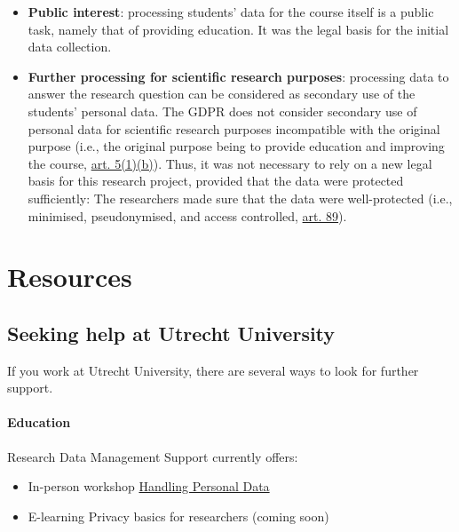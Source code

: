 \documentclass[
]{book}
\providecommand{\tightlist}{%
  \setlength{\itemsep}{0pt}\setlength{\parskip}{0pt}}
\begin{document}
\begin{itemize}
  \begin{itemize}
  \tightlist
  \item
    \textbf{Public interest}: processing students' data for the course itself is a
    public task, namely that of providing education. It was the legal basis for
    the initial data collection.
  \item
    \textbf{Further processing for scientific research purposes}: processing data to
    answer the research question can be considered as secondary use of the
    students' personal data. The GDPR does not consider secondary use of personal
    data for scientific research purposes incompatible with the original purpose
    (i.e., the original purpose being to provide education and improving the
    course, \href{https://gdpr-info.eu/art-5-gdpr/}{art. 5(1)(b)}).
    Thus, it was not necessary to rely on a new legal basis for this research
    project, provided that the data were protected sufficiently: The researchers
    made sure that the data were well-protected (i.e., minimised, pseudonymised,
    and access controlled, \href{https://gdpr-info.eu/art-89-gdpr/}{art. 89}).
  \end{itemize}
\end{itemize}

\hypertarget{part-resources}{%
\part*{Resources}\label{part-resources}}

\hypertarget{seeking-help}{%
\chapter{Seeking help at Utrecht University}\label{seeking-help}}

If you work at Utrecht University, there are several ways to look for further support.

\hypertarget{education}{%
\subsection{Education}\label{education}}

Research Data Management Support currently offers:

\begin{itemize}
\tightlist
\item
  In-person workshop \href{https://www.uu.nl/en/research/research-data-management/training-workshops/handling-personal-data-in-research}{Handling Personal Data}
\item
  E-learning Privacy basics for researchers (coming soon)
\end{itemize}
\end{document}
